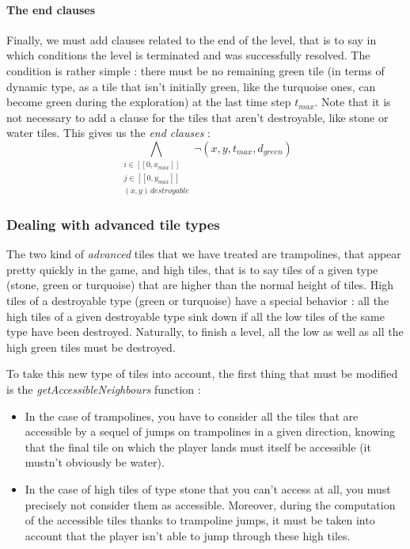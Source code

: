 \documentclass[a4paper, 12pt, titlepage]{article}
\begin{document}
\paragraph{The end clauses}
Finally, we must add clauses related to the end of the level, that is to say in
which conditions the level is terminated and was successfully resolved. The
condition is rather simple : there must be no remaining green tile (in terms of
dynamic type, as a tile that isn't initially green, like the turquoise ones, can
become green during the exploration) at the last time step $t_{max}$. Note that
it is not necessary to add a clause for the tiles that aren't destroyable, like
stone or water tiles. This gives us the {\em end clauses} :
\begin{equation}
\bigwedge \limits_{\substack{i \in [\![0, x_{max}]\!]\\
			     j \in [\![0, y_{max}]\!]\\
			     (x, y) \, destroyable}}
\neg(x, y, t_{max}, d_{green})
\end{equation}


\subsubsection{Dealing with advanced tile types}
The two kind of {\em advanced} tiles that we have treated are trampolines, that
appear pretty quickly in the game, and high tiles, that is to say tiles of a
given type (stone, green or turquoise) that are higher than the normal height of
tiles. High tiles of a destroyable type (green or turquoise) have a special
behavior : all the high tiles of a given destroyable type sink down if all the
low tiles of the same type have been destroyed. Naturally, to finish a level,
all the low as well as all the high green tiles must be destroyed.

To take this new type of tiles into account, the first thing that must be
modified is the {\em getAccessibleNeighbours} function :
\begin{itemize}
\item In the case of trampolines, you have to consider all the tiles that are
      accessible by a sequel of jumps on trampolines in a given direction,
      knowing that the final tile on which the player lands must itself be
      accessible (it mustn't obviously be water).
\item In the case of high tiles of type stone that you can't access at all, you
      must precisely not consider them as accessible. Moreover, during the
      computation of the accessible tiles thanks to trampoline jumps, it must be
      taken into account that the player isn't able to jump through these high
      tiles.
\end{itemize}
\end{document}
